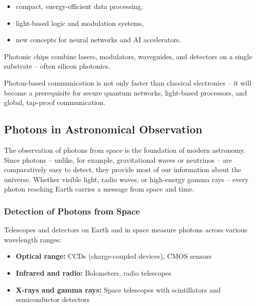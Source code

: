 \begin{itemize}
	\item compact, energy-efficient data processing,
	\item light-based logic and modulation systems,
	\item new concepts for neural networks and AI accelerators.
\end{itemize}

Photonic chips combine lasers, modulators, waveguides, and detectors on a single substrate – often silicon photonics.
\newpage
\noindent
\begin{tcolorbox}[hinweisbox, title=Future of Photonic Communication] 
	\label{box:Zukunft Kommunikation}
	\small
	Photon-based communication is not only faster than classical electronics – it will become a prerequisite for secure quantum networks, light-based processors, and global, tap-proof communication.
\end{tcolorbox}

\subsection{Photons in Astronomical Observation}

The observation of photons from space is the foundation of modern astronomy. Since photons – unlike, for example, gravitational waves or neutrinos – are comparatively easy to detect, they provide most of our information about the universe. Whether visible light, radio waves, or high-energy gamma rays – every photon reaching Earth carries a message from space and time.

\subsubsection{Detection of Photons from Space}

Telescopes and detectors on Earth and in space measure photons across various wavelength ranges:

\begin{itemize}
	\item \textbf{Optical range:} CCDs (charge-coupled devices), CMOS sensors
	\item \textbf{Infrared and radio:} Bolometers, radio telescopes
	\item \textbf{X-rays and gamma rays:} Space telescopes with scintillators and semiconductor detectors
\end{itemize}

